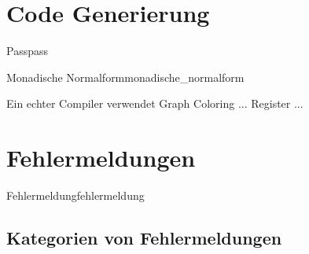 \section{Code Generierung}
\label{sec:code_generierung}
\begin{Definition}{Pass}{pass}
\end{Definition}
\begin{Definition}{Monadische Normalform}{monadische_normalform}
\end{Definition}
\begin{Special_Paragraph}
  Ein echter Compiler verwendet Graph Coloring ... Register ...
\end{Special_Paragraph}

\section{Fehlermeldungen}
\begin{Definition}{Fehlermeldung}{fehlermeldung}
\end{Definition}
\subsection{Kategorien von Fehlermeldungen}
